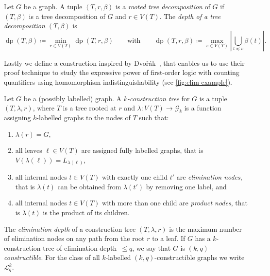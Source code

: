 \documentclass[a4paper,UKenglish,cleveref, autoref, thm-restate]{lipics-v2021}
\newcommand{\Lkq}{\ensuremath{\mathcal{L}_{q}^{k}}}
\newcommand{\CG}{\ensuremath{\mathcal G}}
\newcommand{\impl}{\ensuremath{\rightarrow}}
\DeclareMathOperator{\dep}{dp}
\newcommand{\elimOrd}[2]{$(#1,#2)$-constructible}
\newcommand{\elimDepth}{elimination depth}
\newcommand{\labels}[1]{\ensuremath{L_{#1}}}
\begin{document}
\begin{definition}
	\label{def:depth-treedec}
	Let $G$ be a graph.
	A tuple $(T,r,\beta)$ is a \emph{rooted tree decomposition} of $G$
	if $(T,\beta)$ is a tree decomposition of $G$ and $r \in V(T)$.
	The \emph{depth of a tree decomposition $(T,\beta)$} is
	\begin{equation*}
		\dep(T,\beta)\coloneqq \min_{r\in V(T)} \dep(T,r,\beta)
		\qquad \text{with}
		\qquad
		\dep(T,r,\beta)\coloneqq \max_{v \in V(T)} \left| \bigcup_{t\preceq v} \beta(t) \right|.
	\end{equation*}
\end{definition}

Lastly we define a construction inspired by Dvo\v{r}\'ak~\cite{dvorak_recognizing_2010}, that enables us to use their proof technique to study the expressive power of first-order logic with counting quantifiers using homomorphism indistinguishability (see \cref{fig:elim-example}).

\begin{definition}
	\label{def:Ekq}
	Let $G$ be a (possibly labelled) graph. A \emph{$k$-construction tree} for $G$ is a tuple $(T,\lambda,r)$, where $T$ is a tree rooted at $r$ and $\lambda\colon V(T)\impl \CG_k$ is a function assigning $k$-labelled graphs to the nodes of $T$ such that:
	\begin{enumerate}
		\item $\lambda(r)=G$, \label{ct1}
		\item all leaves $\ell\in V(T)$ are assigned fully labelled graphs, that is $V(\lambda(\ell))=\labels{\lambda(\ell)}$,
		\item all internal nodes $t\in V(T)$ with exactly one child $t'$ are \emph{elimination nodes}, that is $\lambda(t)$ can be obtained from $\lambda(t')$ by removing one label, and
		\item all internal nodes $t\in V(T)$ with more than one child are \emph{product nodes}, that is $\lambda(t)$ is the product of its children.
	\end{enumerate}
	The \emph{\elimDepth} of a construction tree $(T,\lambda,r)$ is the maximum number of elimination nodes on any path from the root $r$ to a leaf.
	If $G$ has a $k$-construction tree of \elimDepth\ $\leq q$, we say that $G$ is \emph{\elimOrd{k}{q}}.
	For the class of all $k$-labelled \elimOrd{k}{q} graphs we write \Lkq.
\end{definition}
\end{document}
